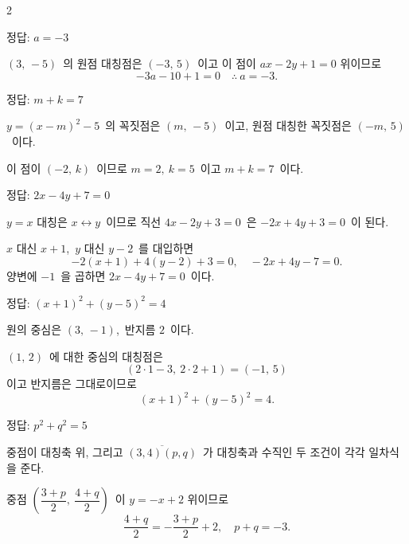 \documentclass[10pt,fleqn]{article}
\begin{document}
\begin{multicols*}{2}
\begin{dmanswerbox}
정답: $a=-3$
\end{dmanswerbox}

$(3,\, -5)$\ 의 원점 대칭점은 $(-3,\, 5)$\ 이고 이 점이 $ax - 2y + 1 = 0$ 위이므로
\[ -3a - 10 + 1 = 0 \quad\therefore\ a = -3. \]

\begin{dmanswerbox}
정답: $m+k=7$
\end{dmanswerbox}

$y = (x - m)^2 - 5$\ 의 꼭짓점은 $(m,\, -5)$\ 이고, 원점 대칭한 꼭짓점은 $(-m,\, 5)$\ 이다.

이 점이 $(-2,\, k)$\ 이므로 $m = 2,\ k = 5$\ 이고 $m + k = 7$\ 이다.

\begin{dmanswerbox}
정답: $2x-4y+7=0$
\end{dmanswerbox}

$y = x$ 대칭은 $x \leftrightarrow y$\ 이므로 직선 $4x - 2y + 3 = 0$\ 은 $-2x + 4y + 3 = 0$\ 이 된다.

$x$ 대신 $x + 1$,\ $y$ 대신 $y - 2$\ 를 대입하면
\[ -2(x + 1) + 4(y - 2) + 3 = 0,\quad -2x + 4y - 7 = 0. \]
양변에 $-1$\ 을 곱하면 $2x - 4y + 7 = 0$\ 이다.

\begin{dmanswerbox}
정답: $(x+1)^2+(y-5)^2=4$
\end{dmanswerbox}

원의 중심은 $(3,\, -1)$,\ 반지름 $2$\ 이다.

$(1,\, 2)$\ 에 대한 중심의 대칭점은
\[ (2 \cdot 1 - 3,\ 2 \cdot 2 + 1) = (-1,\, 5) \]
이고 반지름은 그대로이므로
\[ (x + 1)^2 + (y - 5)^2 = 4. \]

\begin{dmanswerbox}
정답: $p^2+q^2=5$
\end{dmanswerbox}

중점이 대칭축 위, 그리고 $\overline{(3,4)(p,q)}$\ 가 대칭축과 수직인 두 조건이 각각 일차식을 준다.

중점 $\left( \dfrac{3 + p}{2},\ \dfrac{4 + q}{2} \right)$\ 이 $y = -x + 2$ 위이므로
\[ \dfrac{4 + q}{2} = -\dfrac{3 + p}{2} + 2,\quad p + q = -3. \]


\end{multicols*}
\end{document}
